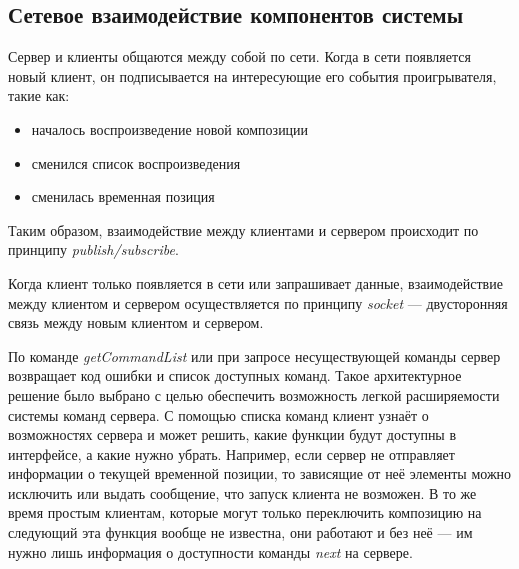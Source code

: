 \subsection{Сетевое взаимодействие компонентов системы}

Сервер и клиенты общаются между собой по сети. Когда в сети появляется
новый клиент, он подписывается на интересующие его события
проигрывателя, такие как:

\begin{itemize}
\item{ началось воспроизведение новой композиции }
\item{ сменился список воспроизведения }
\item{ сменилась временная позиция }
\end{itemize}

Таким образом, взаимодействие между клиентами и сервером происходит по
принципу \textit{publish/subscribe}.


Когда клиент только появляется в сети или запрашивает данные,
взаимодействие между клиентом и сервером осуществляется по принципу
\textit{socket} ---  двусторонняя связь между новым клиентом и
сервером.

По команде \textit{getCommandList} или при запросе несуществующей
команды сервер возвращает код ошибки и список доступных команд. Такое
архитектурное решение было выбрано с целью обеспечить возможность
легкой расширяемости системы команд сервера. С помощью списка команд
клиент узнаёт о возможностях сервера и может решить, какие функции
будут доступны в интерфейсе, а какие нужно убрать. Например, если
сервер не отправляет информации о текущей временной позиции, то
зависящие от неё элементы можно исключить или выдать сообщение, что
запуск клиента не возможен. В то же время простым клиентам, которые
могут только переключить композицию на следующий эта функция вообще не
известна, они работают и без неё --- им нужно лишь информация о
доступности команды \textit{next} на сервере.
